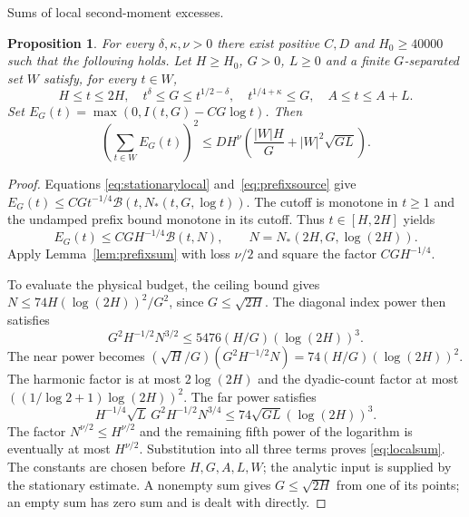 \documentclass[11pt,a4paper]{article}
\numberwithin{equation}{section}
\newtheorem{proposition}[theorem]{Proposition}
\theoremstyle{definition}
\begin{document}
\par\medskip\noindent Sums of local second-moment excesses.
\begin{proposition}\label{prop:localsum}
For every $\delta,\kappa,\nu>0$ there exist positive $C,D$ and $H_0\ge40000$
such that the following holds. Let $H\ge H_0$, $G>0$, $L\ge0$ and a finite
$G$-separated set $W$ satisfy, for every $t\in W$,
\[
 H\le t\le2H,\quad t^\delta\le G\le t^{1/2-\delta},\quad
 t^{1/4+\kappa}\le G,\quad A\le t\le A+L.
\]
Set $E_G(t)=\max(0,I(t,G)-CG\log t)$. Then
\begin{equation}\label{eq:localsum}
 \left(\sum_{t\in W}E_G(t)\right)^2
       \le DH^\nu\left(\frac{|W|H}{G}+|W|^2\sqrt{GL}\right).
\end{equation}
\end{proposition}
\begin{proof}
Equations \eqref{eq:stationarylocal} and~\eqref{eq:prefixsource} give
$E_G(t)\le CGt^{-1/4}\mathscr B(t,N_*(t,G,\log t))$.
The cutoff is monotone in $t\ge1$ and the undamped prefix bound monotone in its
cutoff. Thus $t\in[H,2H]$ yields
\[
 E_G(t)\le CGH^{-1/4}\mathscr B(t,N),
 \qquad N=N_*(2H,G,\log(2H)).
\]
Apply Lemma~\ref{lem:prefixsum} with loss $\nu/2$ and square the factor
$CGH^{-1/4}$.

To evaluate the physical budget, the ceiling bound gives
$N\le74H(\log(2H))^2/G^2$, since $G\le\sqrt{2H}$.
The diagonal index power then satisfies
\[
 G^2H^{-1/2}N^{3/2}\le5476(H/G)(\log(2H))^3.
\]
The near power becomes
$(\sqrt H/G)(G^2H^{-1/2}N)=74(H/G)(\log(2H))^2$.
The harmonic factor is at most $2\log(2H)$ and the dyadic-count factor at
most $((1/\log2+1)\log(2H))^2$.
The far power satisfies
\[
 H^{-1/4}\sqrt L\,G^2H^{-1/2}N^{3/4}
       \le74\sqrt{GL}(\log(2H))^3.
\]
The factor $N^{\nu/2}\le H^{\nu/2}$ and the remaining fifth power of the
logarithm is eventually at most $H^{\nu/2}$. Substitution into all three
terms proves \eqref{eq:localsum}. The constants are chosen before
$H,G,A,L,W$; the analytic input is supplied by the
stationary estimate. A nonempty sum gives $G\le\sqrt{2H}$ from one of its
points; an empty sum has zero sum and is dealt with directly.
\end{proof}
\end{document}
